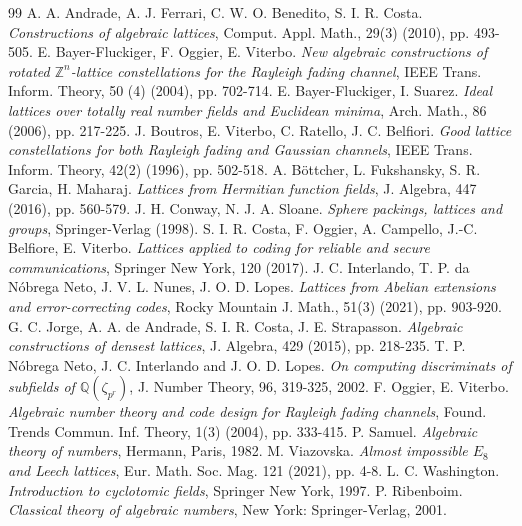 \documentclass{amsart}
\begin{document}
\begin{thebibliography}{99}
 A. A. Andrade, A. J. Ferrari, C. W. O. Benedito, S. I. R. Costa. \textit{Constructions of algebraic lattices}, Comput. Appl. Math., 29(3) (2010), pp. 493-505.
 E. Bayer-Fluckiger, F. Oggier, E. Viterbo. \textit{New algebraic constructions of rotated $\mathbb{Z}^n$-lattice constellations for the Rayleigh fading channel}, IEEE Trans. Inform. Theory, 50 (4) (2004), pp. 702-714.
 E. Bayer-Fluckiger, I. Suarez. \textit{Ideal lattices over totally real number fields and Euclidean minima}, Arch. Math., 86 (2006), pp. 217-225.
 J. Boutros, E. Viterbo, C. Ratello, J. C. Belfiori. \textit{Good lattice constellations for both Rayleigh fading and Gaussian channels}, IEEE Trans. Inform. Theory, 42(2) (1996), pp. 502-518.
 A. B\"ottcher, L. Fukshansky, S. R. Garcia, H. Maharaj. \textit{Lattices from Hermitian function fields}, J. Algebra, 447 (2016), pp. 560-579.
 J. H. Conway, N. J. A. Sloane. \textit{Sphere packings, lattices and groups}, Springer-Verlag (1998).
 S. I. R. Costa, F. Oggier, A. Campello, J.-C. Belfiore, E. Viterbo. \textit{Lattices applied to coding for reliable and secure communications}, Springer New York, 120 (2017).
 J. C. Interlando, T. P. da N\'obrega Neto, J. V. L. Nunes, J. O. D. Lopes. \textit{Lattices from Abelian extensions and error-correcting codes}, Rocky Mountain J. Math., 51(3) (2021), pp. 903-920.
 G. C. Jorge, A. A. de Andrade, S. I. R. Costa, J. E. Strapasson. \textit{Algebraic constructions of densest lattices}, J. Algebra, 429 (2015), pp. 218-235.
 T. P. N\'obrega Neto, J. C. Interlando and J. O. D. Lopes. \textit{On computing discriminats of subfields of $\mathbb{Q}(\zeta_{p^r})$}, J. Number Theory, 96, 319-325, 2002.
 F. Oggier, E. Viterbo. \textit{Algebraic number theory and code design for Rayleigh fading channels}, Found. Trends Commun. Inf. Theory, 1(3) (2004), pp. 333-415.
 P. Samuel. \textit{Algebraic theory of numbers}, Hermann, Paris, 1982. 
 M. Viazovska. \textit{Almost impossible $E_8$ and Leech lattices}, Eur. Math. Soc. Mag. 121 (2021), pp. 4-8.
 L. C. Washington. \textit{Introduction to cyclotomic fields}, Springer New York, 1997.
 P. Ribenboim. \textit{Classical theory of algebraic numbers}, New York: Springer-Verlag, 2001.


\end{thebibliography} 
\end{document}
